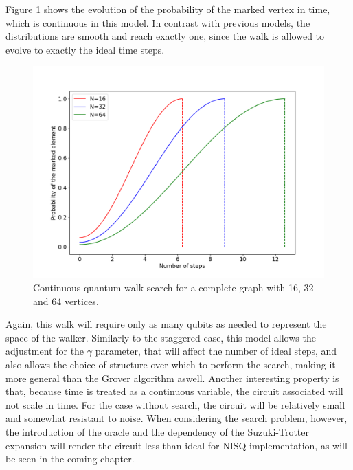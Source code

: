 \documentclass[../../dissertation.tex]{subfiles}
\begin{document}
Figure \ref{fig:ContSearch} shows the evolution of the probability of the
marked vertex in time, which is continuous in this model. In contrast with
previous models, the distributions are smooth and reach exactly one, since the
walk is allowed to evolve to exactly the ideal time steps.
\begin{figure}[!t]
	\centering \includegraphics[scale=0.40]{img/ContQuantumWalk/Search/163264.png}
	\caption{Continuous quantum walk search for a complete graph with 16, 32 and 64 vertices.}\label{fig:ContSearch}
\end{figure}\par

Again, this walk will require only as many qubits as needed to represent the
space of the walker. Similarly to the staggered case, this model allows the
adjustment for the $\gamma$ parameter, that will affect the number of ideal
steps, and also allows the choice of structure over which to perform the
search, making it more general than the Grover algorithm aswell. Another
interesting property is that, because time is treated as a continuous variable,
the circuit associated will not scale in time. For the case without
search, the circuit will be relatively small and somewhat resistant to noise.
When considering the search problem, however, the introduction of the oracle
and the dependency of the Suzuki-Trotter expansion will render the circuit less
than ideal for NISQ implementation, as will be seen in the coming chapter.
\end{document}
